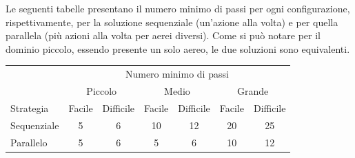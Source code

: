 \documentclass[a4paper,oneside,12pt]{book}
\begin{document}
    Le seguenti tabelle presentano il numero minimo di passi per ogni configurazione, rispettivamente, per la soluzione
    sequenziale (un'azione alla volta) e per quella parallela (più azioni alla volta per aerei diversi).
    Come si può notare per il dominio piccolo, essendo presente un solo aereo, le due soluzioni sono equivalenti.
    \begin{center}

        \begin{tabular}{l c c c c c c}
            \toprule %
            &\multicolumn{6}{c}{Numero minimo di passi} \\
            \cmidrule(l){2-7}
            & \multicolumn{2}{c}{Piccolo} & \multicolumn{2}{c}{Medio} & \multicolumn{2}{c}{Grande} \\
            \cmidrule(l){2-7}
            Strategia & Facile & Difficile & Facile & Difficile & Facile & Difficile\\
            \midrule
            Sequenziale &5  &6  &10 &12 & 20    & 25\\ %
            Parallelo   &5  &6  &5  &6  & 10    & 12\\ %

            \bottomrule
        \end{tabular}
    \end{center}
\end{document}
